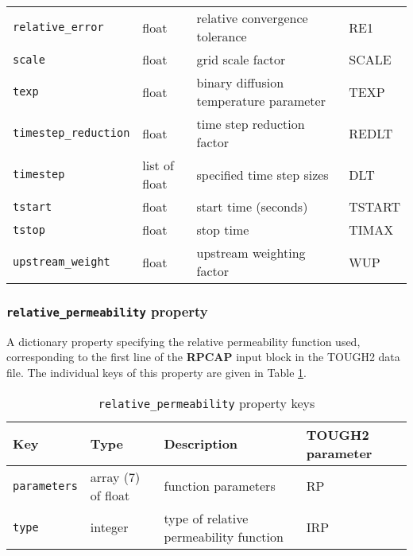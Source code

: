 \begin{sidewaystable}
\begin{center}
\begin{tabular}{|l|l|l|l|}
      \texttt{relative\_error} & float & relative convergence tolerance & RE1\\
      \texttt{scale} & float & grid scale factor & SCALE\\
      \texttt{texp} & float & binary diffusion temperature parameter & TEXP\\
      \texttt{timestep\_reduction} & float & time step reduction factor & REDLT\\
      \texttt{timestep} & list of float & specified time step sizes & DLT\\
      \texttt{tstart} & float & start time (seconds) & TSTART\\
      \texttt{tstop} & float & stop time & TIMAX\\
      \texttt{upstream\_weight} & float & upstream weighting factor & WUP\\
      \hline
    \end{tabular}
    \caption{\texttt{parameter} property keys}
    \label{tb:parameter}
  \end{center}
\end{sidewaystable}

\begin{snugshade}
\subsubsection{\texttt{relative\_permeability} property}
\end{snugshade}
\label{sec:t2data:relative_permeability}

A dictionary property specifying the relative permeability function used, corresponding to the first line of the \textbf{RPCAP} input block in the TOUGH2 data file.  The individual keys of this property are given in Table \ref{tb:relativepermeability}.

\begin{table}
  \begin{center}
    \begin{tabular}{|l|l|l|p{20mm}|}
      \hline
      \textbf{Key} & \textbf{Type} & \textbf{Description} & \textbf{TOUGH2 parameter}\\
      \hline
      \texttt{parameters} & array (7) of float & function parameters & RP\\
      \texttt{type} & integer & type of relative permeability function & IRP\\
      \hline
    \end{tabular}
    \caption{\texttt{relative\_permeability} property keys}
    \label{tb:relativepermeability}
  \end{center}
\end{table}

